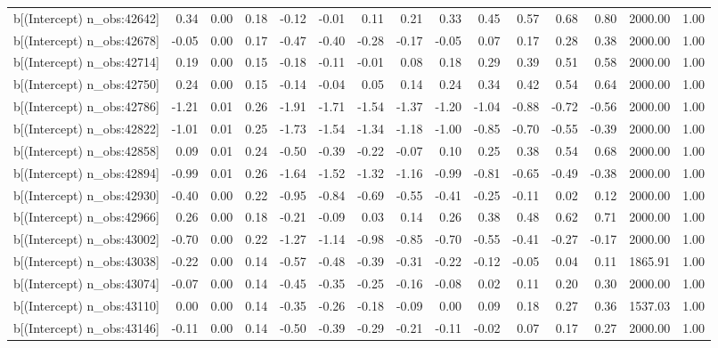 \begin{table}[ht]
\begin{tabular}{rrrrrrrrrrrrrrr}
  b[(Intercept) n\_obs:42642] & 0.34 & 0.00 & 0.18 & -0.12 & -0.01 & 0.11 & 0.21 & 0.33 & 0.45 & 0.57 & 0.68 & 0.80 & 2000.00 & 1.00 \\ 
  b[(Intercept) n\_obs:42678] & -0.05 & 0.00 & 0.17 & -0.47 & -0.40 & -0.28 & -0.17 & -0.05 & 0.07 & 0.17 & 0.28 & 0.38 & 2000.00 & 1.00 \\ 
  b[(Intercept) n\_obs:42714] & 0.19 & 0.00 & 0.15 & -0.18 & -0.11 & -0.01 & 0.08 & 0.18 & 0.29 & 0.39 & 0.51 & 0.58 & 2000.00 & 1.00 \\ 
  b[(Intercept) n\_obs:42750] & 0.24 & 0.00 & 0.15 & -0.14 & -0.04 & 0.05 & 0.14 & 0.24 & 0.34 & 0.42 & 0.54 & 0.64 & 2000.00 & 1.00 \\ 
  b[(Intercept) n\_obs:42786] & -1.21 & 0.01 & 0.26 & -1.91 & -1.71 & -1.54 & -1.37 & -1.20 & -1.04 & -0.88 & -0.72 & -0.56 & 2000.00 & 1.00 \\ 
  b[(Intercept) n\_obs:42822] & -1.01 & 0.01 & 0.25 & -1.73 & -1.54 & -1.34 & -1.18 & -1.00 & -0.85 & -0.70 & -0.55 & -0.39 & 2000.00 & 1.00 \\ 
  b[(Intercept) n\_obs:42858] & 0.09 & 0.01 & 0.24 & -0.50 & -0.39 & -0.22 & -0.07 & 0.10 & 0.25 & 0.38 & 0.54 & 0.68 & 2000.00 & 1.00 \\ 
  b[(Intercept) n\_obs:42894] & -0.99 & 0.01 & 0.26 & -1.64 & -1.52 & -1.32 & -1.16 & -0.99 & -0.81 & -0.65 & -0.49 & -0.38 & 2000.00 & 1.00 \\ 
  b[(Intercept) n\_obs:42930] & -0.40 & 0.00 & 0.22 & -0.95 & -0.84 & -0.69 & -0.55 & -0.41 & -0.25 & -0.11 & 0.02 & 0.12 & 2000.00 & 1.00 \\ 
  b[(Intercept) n\_obs:42966] & 0.26 & 0.00 & 0.18 & -0.21 & -0.09 & 0.03 & 0.14 & 0.26 & 0.38 & 0.48 & 0.62 & 0.71 & 2000.00 & 1.00 \\ 
  b[(Intercept) n\_obs:43002] & -0.70 & 0.00 & 0.22 & -1.27 & -1.14 & -0.98 & -0.85 & -0.70 & -0.55 & -0.41 & -0.27 & -0.17 & 2000.00 & 1.00 \\ 
  b[(Intercept) n\_obs:43038] & -0.22 & 0.00 & 0.14 & -0.57 & -0.48 & -0.39 & -0.31 & -0.22 & -0.12 & -0.05 & 0.04 & 0.11 & 1865.91 & 1.00 \\ 
  b[(Intercept) n\_obs:43074] & -0.07 & 0.00 & 0.14 & -0.45 & -0.35 & -0.25 & -0.16 & -0.08 & 0.02 & 0.11 & 0.20 & 0.30 & 2000.00 & 1.00 \\ 
  b[(Intercept) n\_obs:43110] & 0.00 & 0.00 & 0.14 & -0.35 & -0.26 & -0.18 & -0.09 & 0.00 & 0.09 & 0.18 & 0.27 & 0.36 & 1537.03 & 1.00 \\ 
  b[(Intercept) n\_obs:43146] & -0.11 & 0.00 & 0.14 & -0.50 & -0.39 & -0.29 & -0.21 & -0.11 & -0.02 & 0.07 & 0.17 & 0.27 & 2000.00 & 1.00 \\ 

\end{tabular}
\end{table}
